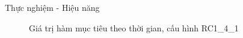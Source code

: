 


\begin{frame}{Thực nghiệm - Hiệu năng}
  \begin{figure}
    \centering
    \quad
  \caption{Giá trị hàm mục tiêu theo thời gian, cấu hình RC1\_4\_1}
  \end{figure}
\end{frame}

